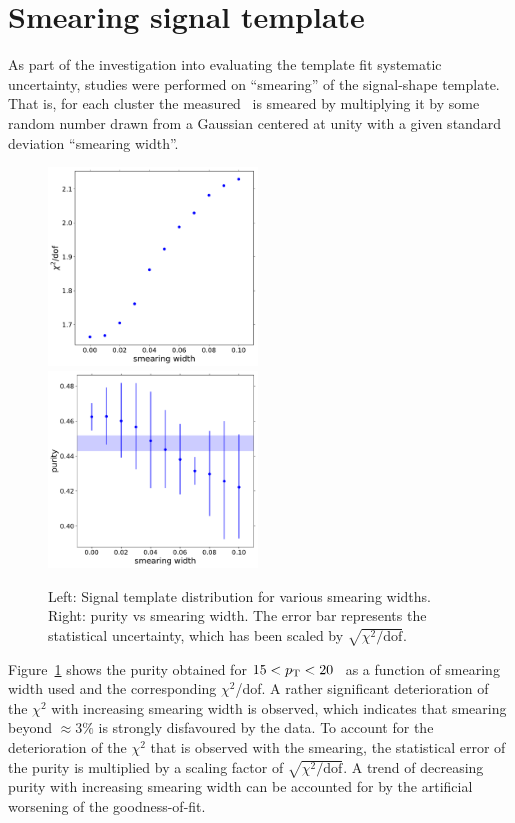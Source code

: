 \section{Smearing signal template}
\label{sec:smearingsignaltemplate}
As part of the investigation into evaluating the template fit systematic uncertainty, studies were performed on ``smearing'' of the signal-shape template. That is, for each cluster the measured \lambdasquare~is smeared by multiplying it by some random number drawn from a Gaussian centered at unity with a given standard deviation ``smearing width''.

\begin{figure}
	\center
	\includegraphics[width=0.495\textwidth]{Checks_Systematics/smeared-chi2s-pp-cluster_Lambda-15-20.pdf}
		\includegraphics[width=0.495\textwidth]{Checks_Systematics/smeared-purities-pp-cluster_Lambda-15-20.pdf}
		\caption{Left: Signal template distribution for various smearing widths. Right: purity vs smearing width. The error bar represents the statistical uncertainty, which has been scaled by $\sqrt{\chi^{2}/\mathrm{dof}}$.}
	\label{fig:smearingSignalShape}
\end{figure}

Figure~\ref{fig:smearingSignalShape} shows the purity obtained for $15<p_{\mathrm{T}}<20$ \GeVc~as a function of smearing width used and the corresponding $\chi^{2}$/dof. A rather significant deterioration of the $\chi^{2}$ with increasing smearing width is observed, which indicates that smearing beyond $\approx3\%$ is strongly disfavoured by the data. To account for the deterioration of the $\chi^{2}$ that is observed with the smearing, the statistical error of the purity is multiplied by a scaling factor of $\sqrt{\chi^{2}/\mathrm{dof}}$. A trend of decreasing purity with increasing smearing width can be accounted for by the artificial worsening of the goodness-of-fit. 


